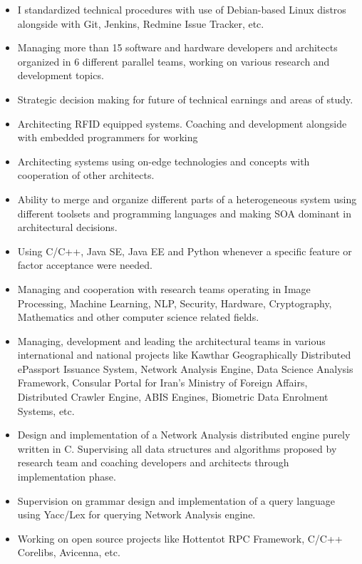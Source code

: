 \documentclass[10pt,a4paper]{article}
\begin{document}
  \begin{itemize}
    \setlength{\rightskip}{2cm}
    \setlength\itemsep{0em}
    \item \small I standardized technical procedures with use of Debian-based Linux distros alongside with Git, Jenkins, Redmine Issue Tracker, etc.
    \item \small Managing more than 15 software and hardware developers and architects organized in 6 different parallel teams, working on various research and development topics.
    \item \small Strategic decision making for future of technical earnings and areas of study.
    \item \small Architecting RFID equipped systems. Coaching and development alongside with embedded programmers for working 
    \item \small Architecting systems using on-edge technologies and concepts with cooperation of other architects.
    \item \small Ability to merge and organize different parts of a heterogeneous system using different toolsets and programming languages and making SOA dominant in architectural decisions.
    \item \small Using C/C++, Java SE, Java EE and Python whenever a specific feature or factor acceptance were needed.
    \item \small Managing and cooperation with research teams operating in Image Processing, Machine Learning, NLP, Security, Hardware, Cryptography, Mathematics and other computer science related fields.
    \item \small Managing, development and leading the architectural teams in various international and national projects like Kawthar  Geographically Distributed ePassport Issuance System, Network Analysis Engine, Data Science Analysis Framework, Consular Portal for Iran's Ministry of Foreign Affairs, Distributed Crawler Engine, ABIS Engines, Biometric Data Enrolment Systems, etc.
    \item \small Design and implementation of a Network Analysis distributed engine purely written in C. Supervising all data structures and algorithms proposed by research team and coaching developers and architects through implementation phase.
    \item \small Supervision on grammar design and implementation of a query language using Yacc/Lex for querying Network Analysis engine.
    \item \small Working on open source projects like Hottentot RPC Framework, C/C++ Corelibs, Avicenna, etc.

\end{itemize}
\end{document}
